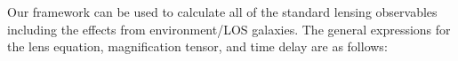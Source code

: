 Our framework can be used to calculate all of the standard lensing observables including the effects from environment/LOS galaxies. The general expressions for the lens equation, magnification tensor, and time delay are as follows:
\setlength{\arraycolsep}{2pt}